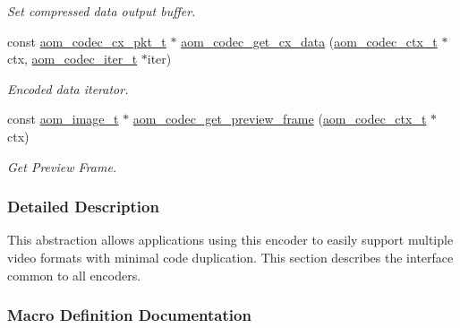 \begin{DoxyCompactItemize}
\begin{DoxyCompactList}\small\item\em Set compressed data output buffer. \end{DoxyCompactList}\item 
const \hyperlink{group__encoder_ga2373bdec1f53ddb0736c53a5ebce7b7b}{aom\+\_\+codec\+\_\+cx\+\_\+pkt\+\_\+t} $\ast$ \hyperlink{group__encoder_gaedc4c56b60d4217677cb561066360884}{aom\+\_\+codec\+\_\+get\+\_\+cx\+\_\+data} (\hyperlink{group__codec_ga9a1d27f9742d9f70783e3c6cb849b5b4}{aom\+\_\+codec\+\_\+ctx\+\_\+t} $\ast$ctx, \hyperlink{group__codec_gadf9e173c9e02788a9999399edab20a02}{aom\+\_\+codec\+\_\+iter\+\_\+t} $\ast$iter)
\begin{DoxyCompactList}\small\item\em Encoded data iterator. \end{DoxyCompactList}\item 
const \hyperlink{aom__image_8h_a5409ae8fdb326fe1cc32622ef4e23748}{aom\+\_\+image\+\_\+t} $\ast$ \hyperlink{group__encoder_gadc3c2f483a71123d760552ef2593e0e5}{aom\+\_\+codec\+\_\+get\+\_\+preview\+\_\+frame} (\hyperlink{group__codec_ga9a1d27f9742d9f70783e3c6cb849b5b4}{aom\+\_\+codec\+\_\+ctx\+\_\+t} $\ast$ctx)
\begin{DoxyCompactList}\small\item\em Get Preview Frame. \end{DoxyCompactList}\end{DoxyCompactItemize}


\subsubsection{Detailed Description}
This abstraction allows applications using this encoder to easily support multiple video formats with minimal code duplication. This section describes the interface common to all encoders. 

\subsubsection{Macro Definition Documentation}
\mbox{\label{group__encoder_gaaf72058c11fcf006c41662114997e12c}} 
